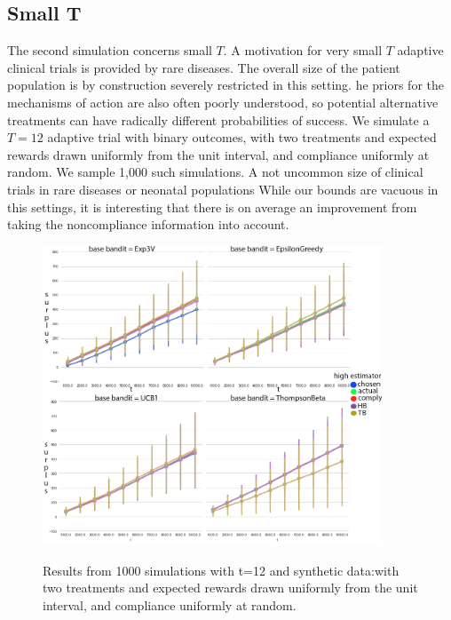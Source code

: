 \subsection{Small T}

The second simulation concerns small $T$. A motivation for very small $T$ adaptive clinical trials is provided by rare diseases. The overall size of the patient population is by construction severely restricted in this setting.
he priors for the mechanisms of action are also often poorly understood, so potential alternative treatments can have radically different probabilities of success. 
We simulate a $T=12$ adaptive trial with binary outcomes, with two treatments and expected rewards drawn uniformly from the unit interval, and compliance uniformly at random. We sample 1,000 such simulations.
A not uncommon size of clinical trials in rare diseases or neonatal populations
While our bounds are vacuous in this settings, it is interesting that there is on average an  improvement from taking the noncompliance information into account.


\begin{figure}[t]
	\centering	
	\includegraphics[width=0.9\textwidth]{bandit/figs/ex3.png}\hspace{1cm}
	\label{fig:ex3}
	\caption{Results from 1000 simulations with t=12 and synthetic data:with two treatments and expected rewards drawn uniformly from the unit interval, and compliance uniformly at random.}
\end{figure}





